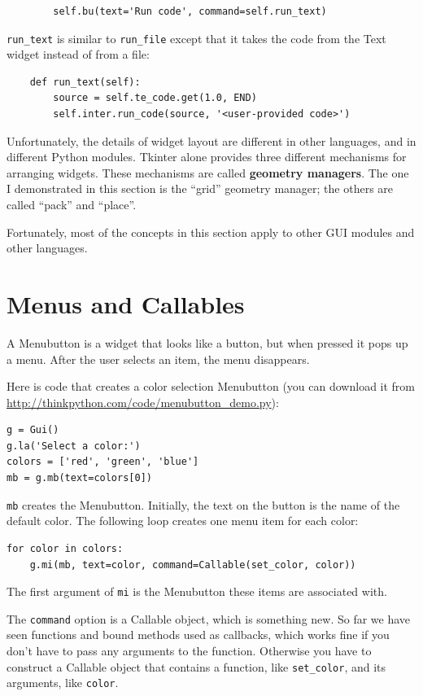 \documentclass[10pt]{book}
\begin{document}
\begin{CJK}{UTF8}{gbsn}
\begin{verbatim}
        self.bu(text='Run code', command=self.run_text)
\end{verbatim}
%
\verb"run_text" is similar to \verb"run_file" except that it takes
the code from the Text widget instead of from a file:

\begin{verbatim}
    def run_text(self):
        source = self.te_code.get(1.0, END)
        self.inter.run_code(source, '<user-provided code>')
\end{verbatim}
%
Unfortunately, the details of widget layout are different in
other languages, and in different Python modules.
Tkinter alone provides three different mechanisms for arranging
widgets.  These mechanisms are called {\bf geometry managers}.
The one I demonstrated in this section is the ``grid'' geometry
manager; the others are called ``pack'' and ``place''.

Fortunately, most of the concepts in this section apply to
other GUI modules and other languages.


\section{Menus and Callables}

A Menubutton is a widget that looks like a button, but when pressed
it pops up a menu.  After the user selects an item, the menu
disappears.

Here is code that creates a color selection Menubutton
(you can download it from \url{http://thinkpython.com/code/menubutton_demo.py}):

\begin{verbatim}
g = Gui()
g.la('Select a color:')
colors = ['red', 'green', 'blue']
mb = g.mb(text=colors[0])
\end{verbatim}
%
{\tt mb} creates the Menubutton.  Initially, the text on the button is
the name of the default color.  The following loop creates one menu
item for each color:

\begin{verbatim}
for color in colors:
    g.mi(mb, text=color, command=Callable(set_color, color))
\end{verbatim}
%
The first argument of {\tt mi} is the Menubutton these items are
associated with.

The {\tt command} option is a Callable object, which is something new.
So far we have seen functions and bound methods used as callbacks,
which works fine if you don't have to pass any arguments to
the function.  Otherwise you have to construct a Callable object
that contains a function, like \verb"set_color", and its arguments,
like {\tt color}.


\end{CJK}
\end{document}
